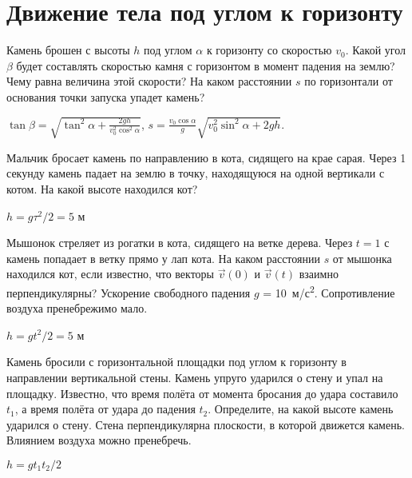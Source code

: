 \section{Движение тела под углом к горизонту}

\begin{ex} 
Камень брошен с высоты $h$ под углом $\alpha$ к горизонту  со скоростью $v_0$. Какой угол $\beta$ будет составлять скоростью камня с горизонтом в момент падения на землю? Чему равна величина этой скорости? На каком расстоянии $s$ по горизонтали от основания точки запуска упадет камень?
\begin{ans}
$\tan \beta = \sqrt{\tan^2 \alpha + \frac{2gh}{v_0^2 \cos^2 \alpha}}$, $s=\frac{v_0 \cos \alpha}{g} \sqrt{v_0^2 \sin^2 \alpha + 2gh}$.
\end{ans}
\end{ex}

\begin{ex}
Мальчик бросает камень по направлению в кота, сидящего на крае сарая. Через 1 секунду камень падает на землю в точку, находящуюся на одной вертикали с котом. На какой высоте находился кот?
\begin{ans}
$h = g\tau^2/2 = 5$ м		
\end{ans}
\end{ex}	

\begin{ex} 
Мышонок стреляет из рогатки в кота, сидящего на ветке дерева. Через $t = 1$ с камень попадает в ветку прямо у лап кота. На каком расстоянии $s$ от мышонка находился кот, если известно, что векторы $\vec v(0)$ и $\vec v(t)$ взаимно перпендикулярны? 
Ускорение свободного падения $g$ = 10~м/с\textsuperscript{2}. Сопротивление воздуха пренебрежимо мало.
\begin{ans}
$h = gt^2/2 = 5$ м
\end{ans}
\end{ex}

\begin{ex}
Камень бросили с горизонтальной площадки под углом к горизонту в направлении вертикальной стены. Камень упруго ударился о стену и упал на площадку. Известно, что время полёта от момента бросания до удара составило $t_1$, а время полёта от удара до падения $t_2$. Определите, на какой высоте камень ударился о стену. Стена перпендикулярна плоскости, в которой движется камень. Влиянием воздуха можно пренебречь.
\begin{ans}
$h = gt_1t_2/2$
\end{ans}
\end{ex}

